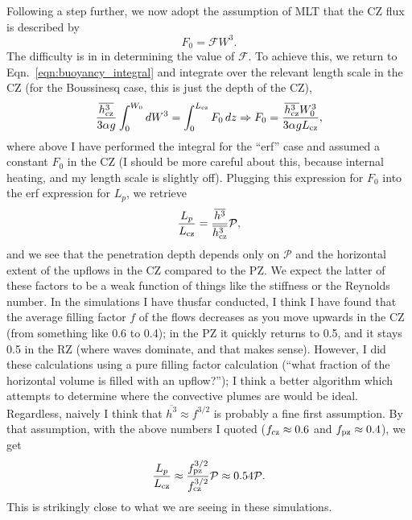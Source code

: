 \documentclass[12pt]{article}
\begin{document}
Following a step further, we now adopt the assumption of MLT that the CZ flux is described by
\begin{equation}
F_{0} = \mathcal{F} W^3.
\end{equation}
The difficulty is in in determining the value of $\mathcal{F}$.
To achieve this, we return to Eqn.~\ref{eqn:buoyancy_integral} and integrate over the relevant length scale in the CZ (for the Boussinesq case, this is just the depth of the CZ),
\begin{equation}
\frac{\overline{h_{\rm{cz}}^3}}{3 \alpha g}\int_0^{W_0} dW^3 = \int_{0}^{L_{\rm{cz}}} F_0\, dz
\Rightarrow
F_0 = \frac{\overline{h_{\rm{cz}}^3} W_0^3}{3 \alpha g L_{\rm{cz}}},
\end{equation}
where above I have performed the integral for the ``erf'' case and assumed a constant $F_0$ in the CZ (I should be more careful about this, because internal heating, and my length scale is slightly off).
Plugging this expression for $F_0$ into the erf expression for $L_p$, we retrieve
\begin{equation}
\frac{L_p}{L_{\rm{cz}}} = \frac{\overline{h^3}}{\overline{h_{\rm{cz}}^3}} \mathcal{P},
\end{equation}
and we see that the penetration depth depends only on $\mathcal{P}$ and the horizontal extent of the upflows in the CZ compared to the PZ.
We expect the latter of these factors to be a weak function of things like the stiffness or the Reynolds number.
In the simulations I have thusfar conducted, I think I have found that the average filling factor $f$ of the flows decreases as you move upwards in the CZ (from something like 0.6 to 0.4); in the PZ it quickly returns to 0.5, and it stays 0.5 in the RZ (where waves dominate, and that makes sense).
However, I did these calculations using a pure filling factor calculation (``what fraction of the horizontal volume is filled with an upflow?''); I think a better algorithm which attempts to determine where the convective plumes are would be ideal.
Regardless, naively I think that $\overline{h^3} \approx f^{3/2}$ is probably a fine first assumption.
By that assumption, with the above numbers I quoted ($f_{\rm{cz}} \approx 0.6$ and $f_{\rm{pz}} \approx 0.4$), we get
\begin{equation}
\frac{L_p}{L_{\rm{cz}}} \approx \frac{f_{\rm{pz}}^{3/2}}{f_{\rm{cz}}^{3/2}}\mathcal{P} \approx 0.54 \mathcal{P}.
\end{equation}
This is strikingly close to what we are seeing in these simulations.



\end{document}
